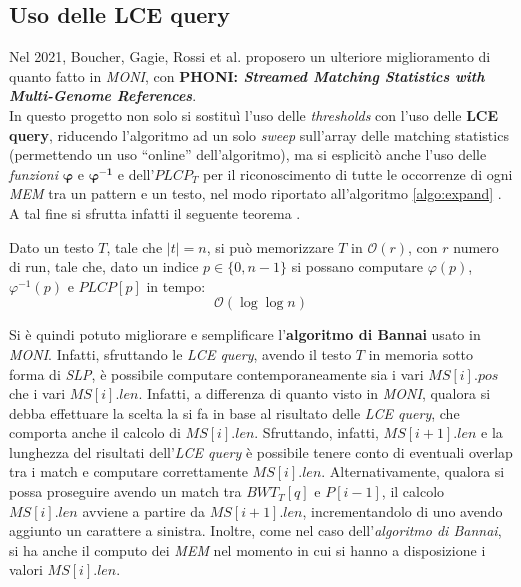 \subsection{Uso delle LCE query}
Nel 2021, Boucher, Gagie, Rossi et al. proposero un ulteriore miglioramento di
quanto fatto in \textit{MONI}, con \textbf{PHONI: \textit{Streamed Matching
    Statistics with Multi-Genome References}}\cite{phoni}.\\
In questo progetto non solo si sostituì l'uso delle \textit{thresholds} con
l'uso delle \textbf{LCE query}, riducendo l'algoritmo ad un solo \textit{sweep}
sull'array delle matching statistics (permettendo un uso ``online''
dell'algoritmo), ma si 
esplicitò anche l'uso delle \textit{funzioni} $\mathbf{\varphi}$ e
$\mathbf{\varphi^{-1}}$ e dell'$PLCP_T$ per il riconoscimento di tutte le
occorrenze di ogni \textit{MEM} tra un pattern e un testo, nel modo 
riportato all'algoritmo \ref{algo:expand} \cite{phoni}.\\
A tal fine si sfrutta infatti il seguente teorema \cite{gagie2020}.
\begin{teorema}
  Dato un testo $T$, tale che $|t|=n$, si può memorizzare $T$ in
  $\mathcal{O}(r)$, con $r$ numero di run, tale che, dato un indice
  $p\in\{0,n-1\}$ si possano computare $\varphi(p)$, $\varphi^{-1}(p)$ e
  $PLCP[p]$ in tempo:
  \begin{equation}
    \label{eq:rlpbwt9}
    \mathcal{O}(\log\log n)
  \end{equation}
\end{teorema}
Si è quindi potuto migliorare e semplificare l'\textbf{algoritmo di Bannai}
usato in \textit{MONI}. Infatti, sfruttando le
\textit{LCE query}, avendo il testo $T$ in memoria sotto forma di \textit{SLP},
è possibile computare contemporaneamente sia i vari
$MS[i].pos$ che i vari $MS[i].len$. Infatti, a differenza di quanto visto in
\textit{MONI}, qualora si debba effettuare la scelta la si fa in base al
risultato delle \textit{LCE query}, che comporta anche il calcolo di
$MS[i].len$. Sfruttando, infatti, $MS[i+1].len$ e la lunghezza del risultati
dell'\textit{LCE query} è possibile tenere conto di eventuali overlap tra i
match e computare correttamente $MS[i].len$. Alternativamente, qualora si possa
proseguire avendo un match tra  
$BWT_T[q]$ e $P[i-1]$, il calcolo $MS[i].len$ avviene a partire da
$MS[i+1].len$, incrementandolo di uno avendo aggiunto un carattere a sinistra.
Inoltre, come nel caso dell'\textit{algoritmo
  di Bannai}, si ha anche il computo dei \textit{MEM} nel momento in cui si
hanno a 
disposizione i valori $MS[i].len$.

